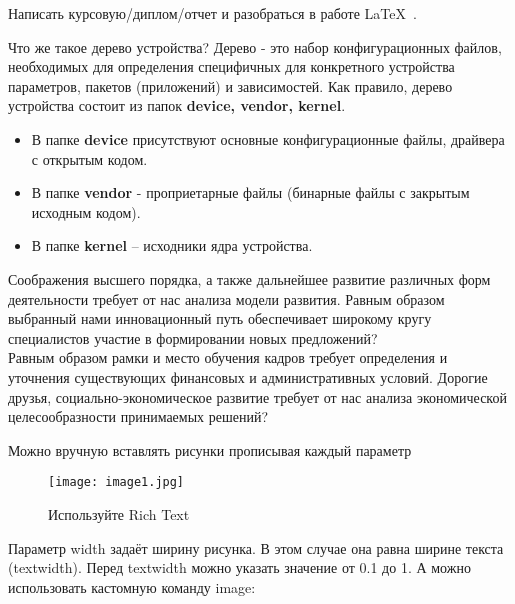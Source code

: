 
Написать курсовую/диплом/отчет и разобраться в работе \LaTeX\ .

Что же такое дерево устройства? Дерево - это набор конфигурационных
файлов, необходимых для определения специфичных для конкретного устройства параметров, пакетов (приложений) и зависимостей. Как правило, дерево устройства состоит из папок \textbf{device, vendor, kernel}.
\begin{itemize}
\item В папке \textbf{device} присутствуют основные конфигурационные файлы, драйвера с открытым кодом.
\item В папке \textbf{vendor} - проприетарные файлы (бинарные файлы с закрытым исходным кодом).
\item В папке \textbf{kernel} – исходники ядра устройства.
\end{itemize}



Соображения высшего порядка, а также дальнейшее развитие различных форм деятельности требует от нас анализа модели развития. Равным образом выбранный нами инновационный путь обеспечивает широкому кругу специалистов участие в формировании новых предложений?\\
Равным образом рамки и место обучения кадров требует определения и уточнения существующих финансовых и административных условий.
Дорогие друзья, социально-экономическое развитие требует от нас анализа экономической целесообразности принимаемых решений? \cite{kistyakovskii} %




Можно вручную вставлять рисунки прописывая каждый параметр

\begin{figure}[!htb]
	\centering
	\texttt{[image: image1.jpg]}
	\caption{Используйте Rich Text}
	\label{fig:image1}
\end{figure}

Параметр width задаёт ширину рисунка. В этом случае она равна ширине текста (textwidth). Перед textwidth можно указать значение от 0.1 до 1.
А можно использовать кастомную команду image:

